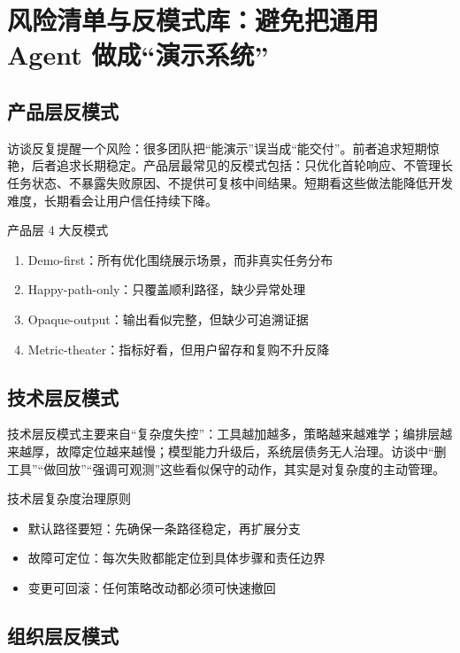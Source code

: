 \section{风险清单与反模式库：避免把通用 Agent 做成“演示系统”}

\subsection{产品层反模式}

访谈反复提醒一个风险：很多团队把“能演示”误当成“能交付”。前者追求短期惊艳，后者追求长期稳定。产品层最常见的反模式包括：只优化首轮响应、不管理长任务状态、不暴露失败原因、不提供可复核中间结果。短期看这些做法能降低开发难度，长期看会让用户信任持续下降。

\begin{warningbox}{产品层 4 大反模式}
\begin{enumerate}
    \item Demo-first：所有优化围绕展示场景，而非真实任务分布
    \item Happy-path-only：只覆盖顺利路径，缺少异常处理
    \item Opaque-output：输出看似完整，但缺少可追溯证据
    \item Metric-theater：指标好看，但用户留存和复购不升反降
\end{enumerate}
\end{warningbox}

\subsection{技术层反模式}

技术层反模式主要来自“复杂度失控”：工具越加越多，策略越来越难学；编排层越来越厚，故障定位越来越慢；模型能力升级后，系统层债务无人治理。访谈中“删工具”“做回放”“强调可观测”这些看似保守的动作，其实是对复杂度的主动管理。

\begin{knowledgebox}{技术层复杂度治理原则}
\begin{itemize}
    \item 默认路径要短：先确保一条路径稳定，再扩展分支
    \item 故障可定位：每次失败都能定位到具体步骤和责任边界
    \item 变更可回滚：任何策略改动都必须可快速撤回
\end{itemize}
\end{knowledgebox}

\subsection{组织层反模式}

